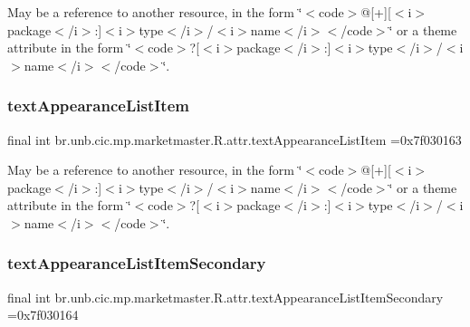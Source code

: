 May be a reference to another resource, in the form \char`\"{}$<$code$>$@\mbox{[}+\mbox{]}\mbox{[}$<$i$>$package$<$/i$>$\+:\mbox{]}$<$i$>$type$<$/i$>$/$<$i$>$name$<$/i$>$$<$/code$>$\char`\"{} or a theme attribute in the form \char`\"{}$<$code$>$?\mbox{[}$<$i$>$package$<$/i$>$\+:\mbox{]}$<$i$>$type$<$/i$>$/$<$i$>$name$<$/i$>$$<$/code$>$\char`\"{}. \mbox{\label{classbr_1_1unb_1_1cic_1_1mp_1_1marketmaster_1_1R_1_1attr_a39379c0c766c07f4a3cb324114573897}} 
\subsubsection{\texorpdfstring{text\+Appearance\+List\+Item}{textAppearanceListItem}}
{\footnotesize\ttfamily final int br.\+unb.\+cic.\+mp.\+marketmaster.\+R.\+attr.\+text\+Appearance\+List\+Item =0x7f030163\hspace{0.3cm}{\ttfamily [static]}}

May be a reference to another resource, in the form \char`\"{}$<$code$>$@\mbox{[}+\mbox{]}\mbox{[}$<$i$>$package$<$/i$>$\+:\mbox{]}$<$i$>$type$<$/i$>$/$<$i$>$name$<$/i$>$$<$/code$>$\char`\"{} or a theme attribute in the form \char`\"{}$<$code$>$?\mbox{[}$<$i$>$package$<$/i$>$\+:\mbox{]}$<$i$>$type$<$/i$>$/$<$i$>$name$<$/i$>$$<$/code$>$\char`\"{}. \mbox{\label{classbr_1_1unb_1_1cic_1_1mp_1_1marketmaster_1_1R_1_1attr_a045b29b1aac65b5bf407da78e746bf0f}} 
\subsubsection{\texorpdfstring{text\+Appearance\+List\+Item\+Secondary}{textAppearanceListItemSecondary}}
{\footnotesize\ttfamily final int br.\+unb.\+cic.\+mp.\+marketmaster.\+R.\+attr.\+text\+Appearance\+List\+Item\+Secondary =0x7f030164\hspace{0.3cm}{\ttfamily [static]}}

